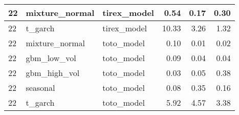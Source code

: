 {\begin{tabular}{lllrrr}
22 & mixture\_normal & tirex\_model & 0.54 & 0.17 & 0.30 \\
\midrule
22 & t\_garch & tirex\_model & 10.33 & 3.26 & 1.32 \\
\midrule
22 & mixture\_normal & toto\_model & 0.10 & 0.01 & 0.02 \\
\midrule
22 & gbm\_low\_vol & toto\_model & 0.09 & 0.04 & 0.04 \\
\midrule
22 & gbm\_high\_vol & toto\_model & 0.03 & 0.05 & 0.38 \\
\midrule
22 & seasonal & toto\_model & 0.08 & 0.35 & 0.16 \\
\midrule
22 & t\_garch & toto\_model & 5.92 & 4.57 & 3.38 \\
\bottomrule
\end{tabular}
}